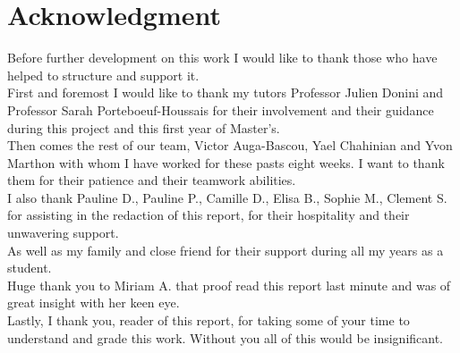 \chapter*{Acknowledgment}
\quad Before further development on this work I would like to thank those who have helped to structure and support it.\\

First and foremost I would like to thank my tutors Professor Julien Donini and Professor Sarah Porteboeuf-Houssais for their involvement and their guidance during this project and this first year of Master's. \\

Then comes the rest of our team, Victor Auga-Bascou, Yael Chahinian and Yvon Marthon with whom I have worked for these pasts eight weeks. I want to thank them for their patience and their teamwork abilities.\\

I also thank Pauline D., Pauline P., Camille D., Elisa B., Sophie M., Clement S. for assisting in the redaction of this report, for their hospitality and their unwavering support. \\

As well as my family and close friend for their support during all my years as a student.\\

Huge thank you to Miriam A. that proof read this report last minute and was of great insight with her keen eye.\\

Lastly, I thank you, reader of this report, for taking some of your time to understand and grade this work. Without you all of this would be insignificant.
\newpage